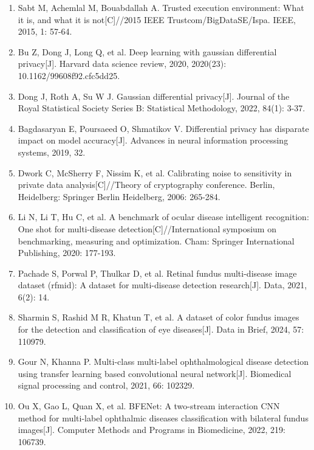 \begin{enumerate}
\item
  \protect{}\label{_Ref213950453}{}Sabt M, Achemlal M, Bouabdallah A. Trusted execution environment: What it is, and what it is not{[}C{]}//2015 IEEE Trustcom/BigDataSE/Ispa. IEEE, 2015, 1: 57-64.
\item
  \protect{}\label{_Ref213950443}{}Bu Z, Dong J, Long Q, et al. Deep learning with gaussian differential privacy{[}J{]}. Harvard data science review, 2020, 2020(23): 10.1162/99608f92.cfc5dd25.
\item
  \protect{}\label{_Ref213950449}{}Dong J, Roth A, Su W J. Gaussian differential privacy{[}J{]}. Journal of the Royal Statistical Society Series B: Statistical Methodology, 2022, 84(1): 3-37.
\item
  \protect{}\label{_Ref213950458}{}Bagdasaryan E, Poursaeed O, Shmatikov V. Differential privacy has disparate impact on model accuracy{[}J{]}. Advances in neural information processing systems, 2019, 32.
\item
  \protect{}\label{_Ref214903493}{}Dwork C, McSherry F, Nissim K, et al. Calibrating noise to sensitivity in private data analysis{[}C{]}//Theory of cryptography conference. Berlin, Heidelberg: Springer Berlin Heidelberg, 2006: 265-284.
\item
  \protect{}\label{_Ref213949402}{}Li N, Li T, Hu C, et al. A benchmark of ocular disease intelligent recognition: One shot for multi-disease detection{[}C{]}//International symposium on benchmarking, measuring and optimization. Cham: Springer International Publishing, 2020: 177-193.
\item
  \protect{}\label{_Ref213949409}{}Pachade S, Porwal P, Thulkar D, et al. Retinal fundus multi-disease image dataset (rfmid): A dataset for multi-disease detection research{[}J{]}. Data, 2021, 6(2): 14.
\item
  \protect{}\label{_RefEDID2024}{}Sharmin S, Rashid M R, Khatun T, et al. A dataset of color fundus images for the detection and classification of eye diseases{[}J{]}. Data in Brief, 2024, 57: 110979.
\item
  \protect{}\label{_Ref214903299}{}Gour N, Khanna P. Multi-class multi-label ophthalmological disease detection using transfer learning based convolutional neural network{[}J{]}. Biomedical signal processing and control, 2021, 66: 102329.
\item
  \protect{}\label{_Ref214903327}{}Ou X, Gao L, Quan X, et al. BFENet: A two-stream interaction CNN method for multi-label ophthalmic diseases classification with bilateral fundus images{[}J{]}. Computer Methods and Programs in Biomedicine, 2022, 219: 106739.
\end{enumerate}
